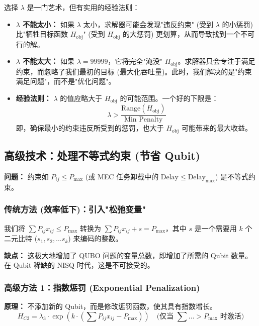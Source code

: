 \documentclass[11pt,a4paper]{article}
\begin{document}
选择 $\lambda$ 是一门艺术，但有实用的经验法则：

\begin{itemize}
\item \textbf{$\lambda$ 不能太小：} 如果 $\lambda$ 太小，求解器可能会发现"违反约束" (受到 $\lambda$ 的小惩罚) 比"牺牲目标函数 $H_{\text{obj}}$" (受到 $H_{\text{obj}}$ 的大惩罚) 更划算，从而导致找到一个不可行的解。

\item \textbf{$\lambda$ 不能太大：} 如果 $\lambda=99999$，它将完全"淹没" $H_{\text{obj}}$。求解器只会专注于满足约束，而忽略了我们最初的目标 (最大化吞吐量)。此时，我们解决的是"约束满足问题"，而不是"优化问题"。

\item \textbf{经验法则：} $\lambda$ 的值应略大于 $H_{\text{obj}}$ 的可能范围。一个好的下限是：
\[\lambda > \frac{\text{Range}(H_{\text{obj}})}{\text{Min Penalty}}\]
即，确保最小的约束违反所受到的惩罚，也大于 $H_{\text{obj}}$ 可能带来的最大收益。
\end{itemize}

\subsection{高级技术：处理不等式约束 (节省 Qubit)}

\textbf{问题：} 约束如 $P_{ij} \le P_{\text{max}}$ (或 MEC 任务卸载中的 $\text{Delay} \le \text{Delay}_{\text{max}}$) 是不等式约束。

\subsubsection{传统方法 (效率低下)：引入"松弛变量"}

我们将 $\sum P_{ij} x_{ij} \le P_{\text{max}}$ 转换为 $\sum P_{ij} x_{ij} + s = P_{\text{max}}$，其中 $s$ 是一个需要用 $k$ 个二元比特 ($s_1, s_2, \ldots s_k$) 来编码的整数。

\textbf{缺点：} 这极大地增加了 QUBO 问题的变量总数，即增加了所需的 Qubit 数量。在 Qubit 稀缺的 NISQ 时代，这是不可接受的。

\subsubsection{高级方法 1：指数惩罚 (Exponential Penalization)}

\textbf{原理：} 不添加新的 Qubit，而是修改惩罚函数，使其具有指数增长。
\[H_{C3} = \lambda_3 \cdot \exp\left( k \cdot \left(\sum P_{ij} x_{ij} - P_{\text{max}}\right) \right) \quad \text{(仅当 } \sum\ldots > P_{\text{max}} \text{ 时激活)}\]
\end{document}
